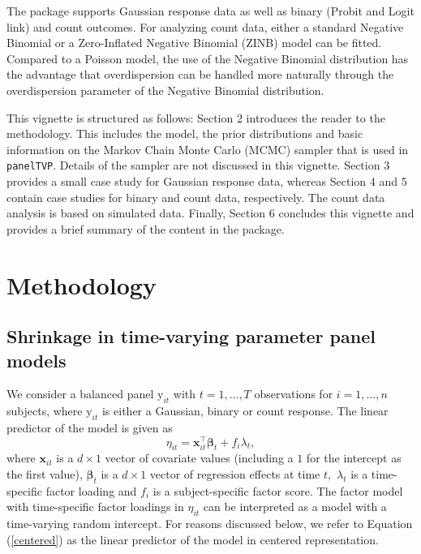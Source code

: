 \documentclass[a4paper, preprint, 3p,
authoryear]{elsarticle} %
\begin{document}
The package supports Gaussian response data as well as binary (Probit
and Logit link) and count outcomes. For analyzing count data, either a
standard Negative Binomial or a Zero-Inflated Negative Binomial (ZINB)
model can be fitted. Compared to a Poisson model, the use of the
Negative Binomial distribution has the advantage that overdispersion can
be handled more naturally through the overdispersion parameter of the
Negative Binomial distribution.

This vignette is structured as follows: Section 2 introduces the reader
to the methodology. This includes the model, the prior distributions and
basic information on the Markov Chain Monte Carlo (MCMC) sampler that is
used in \texttt{panelTVP}. Details of the sampler are not discussed in
this vignette. Section 3 provides a small case study for Gaussian
response data, whereas Section 4 and 5 contain case studies for binary
and count data, respectively. The count data analysis is based on
simulated data. Finally, Section 6 concludes this vignette and provides
a brief summary of the content in the package.

\section{Methodology}\label{methodology}

\subsection{Shrinkage in time-varying parameter panel
models}\label{shrinkage-in-time-varying-parameter-panel-models}

We consider a balanced panel \(\text{y}_{it}\) with \(t = 1,\dots,T\)
observations for \(i = 1,\dots,n\) subjects, where \(\text{y}_{it}\) is
either a Gaussian, binary or count response. The linear predictor of the
model is given as \begin{equation}
\label{centered}
    \eta_{it} = \textbf{x}_{it}^\top \boldsymbol{\beta}_t + f_i\lambda_t,
\end{equation} where \(\textbf{x}_{it}\) is a \(d \times 1\) vector of
covariate values (including a \(1\) for the intercept as the first
value), \(\boldsymbol{\beta}_t\) is a \(d \times 1\) vector of
regression effects at time \(t,\) \(\lambda_t\) is a time-specific
factor loading and \(f_i\) is a subject-specific factor score. The
factor model with time-specific factor loadings in \(\eta_{it}\) can be
interpreted as a model with a time-varying random intercept. For reasons
discussed below, we refer to Equation (\ref{centered}) as the linear
predictor of the model in centered representation.
\end{document}

